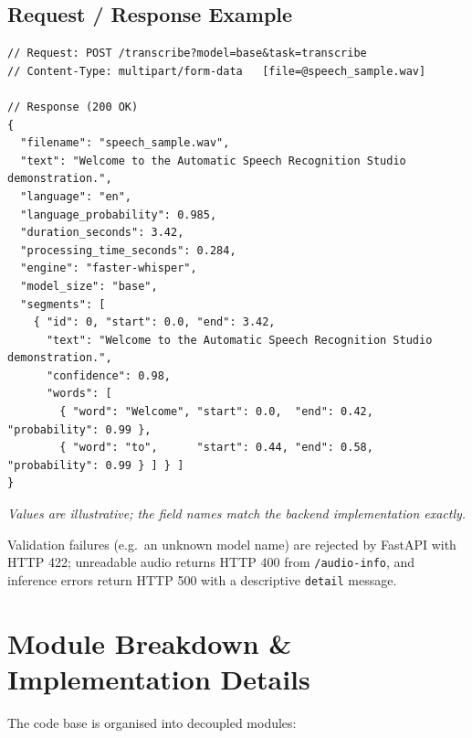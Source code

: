 \documentclass[11pt,a4paper]{article}
\begin{document}
\subsection{Request / Response Example}
\begin{lstlisting}[style=json]
// Request: POST /transcribe?model=base&task=transcribe
// Content-Type: multipart/form-data   [file=@speech_sample.wav]

// Response (200 OK)
{
  "filename": "speech_sample.wav",
  "text": "Welcome to the Automatic Speech Recognition Studio demonstration.",
  "language": "en",
  "language_probability": 0.985,
  "duration_seconds": 3.42,
  "processing_time_seconds": 0.284,
  "engine": "faster-whisper",
  "model_size": "base",
  "segments": [
    { "id": 0, "start": 0.0, "end": 3.42,
      "text": "Welcome to the Automatic Speech Recognition Studio demonstration.",
      "confidence": 0.98,
      "words": [
        { "word": "Welcome", "start": 0.0,  "end": 0.42, "probability": 0.99 },
        { "word": "to",      "start": 0.44, "end": 0.58, "probability": 0.99 } ] } ]
}
\end{lstlisting}
\textit{Values are illustrative; the field names match the backend implementation exactly.}

Validation failures (e.g.\ an unknown model name) are rejected by FastAPI with HTTP 422; unreadable audio returns HTTP 400 from \texttt{/audio-info}, and inference errors return HTTP 500 with a descriptive \texttt{detail} message.

\section{Module Breakdown \& Implementation Details}
The code base is organised into decoupled modules:
\end{document}
